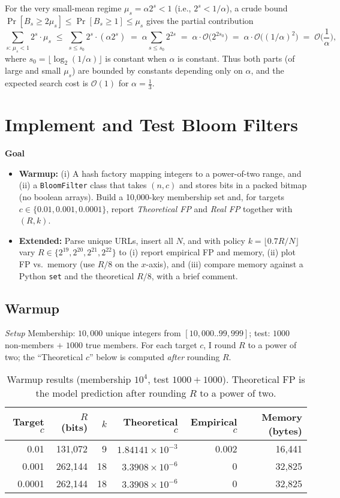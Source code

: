 \documentclass[11pt]{article}
\begin{document}
For the very small-mean regime $\mu_s=\alpha 2^s<1$ (i.e., $2^s<1/\alpha$), a crude bound
$\Pr[B_s\ge 2\mu_s]\le \Pr[B_s\ge 1]\le \mu_s$ gives the partial contribution
\[
\sum_{s:\,\mu_s<1} 2^s\cdot \mu_s
\;\le\; \sum_{s\le s_0} 2^s\cdot (\alpha 2^s)
\;=\; \alpha \sum_{s\le s_0} 2^{2s}
\;=\; \alpha\cdot \mathcal{O}\!\big(2^{2s_0}\big)
\;=\; \alpha\cdot \mathcal{O}\!\big((1/\alpha)^2\big)
\;=\; \mathcal{O}\!\Big(\frac{1}{\alpha}\Big),
\]
where $s_0=\lfloor \log_2(1/\alpha)\rfloor$ is constant when $\alpha$ is constant. Thus both parts
(of large and small $\mu_s$) are bounded by constants depending only on $\alpha$, and the expected
search cost is $\mathcal{O}(1)$ for $\alpha=\tfrac13$.


\newpage

\section{Implement and Test Bloom Filters }

\textbf{Goal}
\begin{itemize}
  \item \textbf{Warmup:} (i) A hash factory mapping integers to a power-of-two range, and (ii) a \texttt{BloomFilter} class that takes $(n,c)$ and stores bits in a packed bitmap (no boolean arrays). Build a 10{,}000-key membership set and, for targets $c\!\in\!\{0.01,0.001,0.0001\}$, report \emph{Theoretical FP} and \emph{Real FP} together with $(R,k)$.
  \item \textbf{Extended:} Parse unique URLs, insert all $N$, and with policy $k=\lfloor 0.7R/N\rfloor$ vary $R\in\{2^{19},2^{20},2^{21},2^{22}\}$ to (i) report empirical FP and memory, (ii) plot FP vs.\ memory (use $R/8$ on the $x$-axis), and (iii) compare memory against a Python \texttt{set} and the theoretical $R/8$, with a brief comment.
\end{itemize}

\subsection*{Warmup}
\emph{Setup} Membership: $10{,}000$ unique integers from $[10{,}000..99{,}999]$; test: $1000$ non-members $+$ $1000$ true members. For each target $c$, I round $R$ to a power of two; the “Theoretical $c$” below is computed \emph{after} rounding $R$.


\begin{table}[h]
  \centering
  \begin{tabular}{rrrrrr}
    \toprule
    Target $c$ & $R$ (bits) & $k$ & Theoretical $c$ & Empirical $c$ & Memory (bytes) \\
    \midrule
    0.01   & 131{,}072 &  9 & $1.84141\times 10^{-3}$ & 0.002 & 16{,}441 \\
    0.001  & 262{,}144 & 18 & $3.3908\times 10^{-6}$  & 0     & 32{,}825 \\
    0.0001 & 262{,}144 & 18 & $3.3908\times 10^{-6}$  & 0     & 32{,}825 \\
    \bottomrule
  \end{tabular}
  \caption{Warmup results (membership $10^4$, test $1000{+}1000$). Theoretical FP is the model prediction after rounding $R$ to a power of two.}
\end{table}
\end{document}
